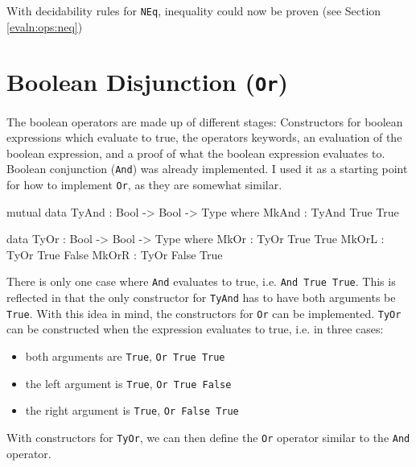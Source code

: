     With decidability rules for \texttt{NEq}, inequality could now be proven (see Section \ref{evaln:ops:neq})
    
\section{Boolean Disjunction (\texttt{Or})}
    The boolean operators are made up of different stages: Constructors for boolean expressions which evaluate to true, the operators keywords, an evaluation of the boolean expression, and a proof of what the boolean expression evaluates to. Boolean conjunction (\texttt{And}) was already implemented. I used it as a starting point for how to implement \texttt{Or}, as they are somewhat similar.
    
    \begin{code}[label={des:tyand-or}, caption={The constructors for true \texttt{And} and \texttt{Or} statements}, escapeinside={(*}{*)}]
        mutual
            data TyAnd : Bool -> Bool -> Type where
                MkAnd  : TyAnd True True
            
            data TyOr : Bool -> Bool -> Type where
                MkOr  : TyOr True True
                MkOrL : TyOr True False
                MkOrR : TyOr False True
    \end{code}

    There is only one case where \texttt{And} evaluates to true, i.e. \texttt{And True True}. This is reflected in that the only constructor for \texttt{TyAnd} has to have both arguments be \texttt{True}. With this idea in mind, the constructors for \texttt{Or} can be implemented. \texttt{TyOr} can be constructed when the expression evaluates to true, i.e. in three cases:
    \begin{itemize}
        \item both arguments are \texttt{True}, \texttt{Or True True}
        \item the left argument is \texttt{True}, \texttt{Or True False}
        \item the right argument is \texttt{True}, \texttt{Or False True}
    \end{itemize}
    
    With constructors for \texttt{TyOr}, we can then define the \texttt{Or} operator similar to the \texttt{And} operator.
    
    \newpage
    
